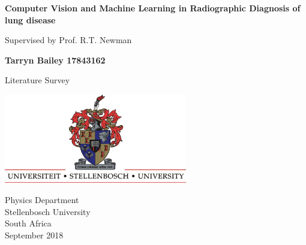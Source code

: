\begin{titlepage}
    \begin{center}
        \vspace*{1cm}
        \Huge
        \textbf{Computer Vision and Machine Learning in Radiographic Diagnosis of lung disease}
        
        \vspace{0.5cm}
        \Large
        Supervised by Prof. R.T. Newman
        
        \vspace{1.5cm}
        
        \textbf{Tarryn Bailey 17843162}
        
        \vfill
        
        Literature Survey
        
        \vspace{8cm}
        
        \includegraphics[width=0.6\textwidth]{images/symbol.jpg}
        
        \large
        Physics Department\\
        Stellenbosch University\\
        South Africa\\
        September 2018\\
        
        
        
    \end{center}    
\end{titlepage}

